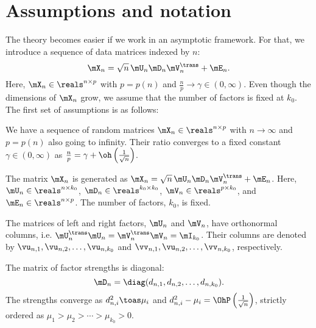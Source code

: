 \section{Assumptions and notation}\label{S:bcv-theory-assumptions}

The theory becomes easier if we work in an asymptotic framework.  For that,
we introduce a sequence of data matrices indexed by $n$:
\begin{equation}
    \mX_{n} = \sqrt{n} \, \mU_n \mD_n \mV_n^\trans + \mE_n.
\end{equation}
Here, $\mX_n \in \reals^{n \times p}$ with $p = p(n)$ and 
$\frac{n}{p} \to \gamma \in (0,\infty)$.  Even though the dimensions of $\mX_n$ grow, we assume that the number of factors is fixed at $k_0$.  The first set of assumptions is as follows:

\begin{assumption}\label{A:optimal-leave-out-shapes}
    We have a sequence of random matrices $\mX_n \in \reals^{n \times p}$ 
    with $n \to \infty$ and $p = p(n)$ also going to infinity.  Their ratio
    converges to a fixed constant $\gamma \in (0, \infty)$ as 
    $\frac{n}{p} = \gamma + \oh\left( \frac{1}{\sqrt{n}} \right)$.
\end{assumption}

\begin{assumption}
    The matrix $\mX_n$ is generated as 
    $\mX_n = \sqrt{n} \, \mU_n \mD_n \mV_n^\trans + \mE_n$.  Here,
    $\mU_n \in \reals^{n \times k_0}$, 
    $\mD_n \in \reals^{k_0 \times k_0}$,
    $\mV_n \in \reals^{p \times k_0}$, and $\mE_n \in \reals^{n \times p}$.
    The number of factors, $k_0$, is fixed.
\end{assumption}

\begin{assumption}
    The matrices of left and right factors, $\mU_n$ and $\mV_n$, have 
    orthonormal columns, i.e. 
    $\mU_n^\trans \mU_n = \mV_n^\trans \mV_n = \mI_{k_0}$.
    Their columns are denoted by
    $\vu_{n,1}, \vu_{n,2}, \ldots, \vu_{n,k_0}$ and
    $\vv_{n,1}, \vu_{n,2}, \ldots, \vv_{n,k_0}$, respectively.
\end{assumption}

\begin{assumption}
    The matrix of factor strengths is diagonal:
    \begin{equation}
        \mD_n = \diag( d_{n,1}, d_{n,2}, \ldots, d_{n,k_0}).  
    \end{equation}
    The strengths
    converge as $d_{n,i}^2 \toas \mu_i$ and 
    $d_{n,i}^2 - \mu_i = \OhP\left( \frac{1}{\sqrt{n}} \right)$, strictly
    ordered as
    \(
        \mu_1 > \mu_2 > \cdots > \mu_{k_0} > 0.
    \)
\end{assumption}

